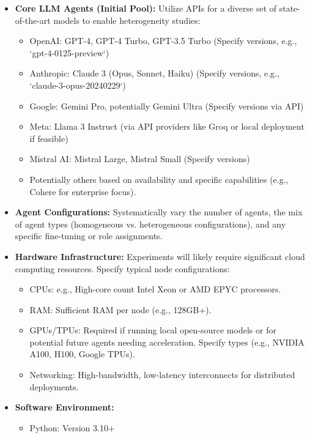 \documentclass[12pt]{amsart}
\begin{document}
\begin{itemize}[leftmargin=*]
    \item \textbf{Core LLM Agents (Initial Pool):} Utilize APIs for a diverse set of state-of-the-art models to enable heterogeneity studies:
        \begin{itemize}
            \item OpenAI: GPT-4, GPT-4 Turbo, GPT-3.5 Turbo (Specify versions, e.g., `gpt-4-0125-preview`)
            \item Anthropic: Claude 3 (Opus, Sonnet, Haiku) (Specify versions, e.g., `claude-3-opus-20240229`)
            \item Google: Gemini Pro, potentially Gemini Ultra (Specify versions via API)
            \item Meta: Llama 3 Instruct (via API providers like Groq or local deployment if feasible)
            \item Mistral AI: Mistral Large, Mistral Small (Specify versions)
            \item Potentially others based on availability and specific capabilities (e.g., Cohere for enterprise focus).
        \end{itemize}
    \item \textbf{Agent Configurations:} Systematically vary the number of agents, the mix of agent types (homogeneous vs. heterogeneous configurations), and any specific fine-tuning or role assignments.
    \item \textbf{Hardware Infrastructure:} Experiments will likely require significant cloud computing resources. Specify typical node configurations:
        \begin{itemize}
            \item CPUs: e.g., High-core count Intel Xeon or AMD EPYC processors.
            \item RAM: Sufficient RAM per node (e.g., 128GB+).
            \item GPUs/TPUs: Required if running local open-source models or for potential future agents needing acceleration. Specify types (e.g., NVIDIA A100, H100, Google TPUs).
            \item Networking: High-bandwidth, low-latency interconnects for distributed deployments.
        \end{itemize}
    \item \textbf{Software Environment:}
        \begin{itemize}
            \item Python: Version 3.10+

\end{itemize}
\end{itemize}
\end{document}
